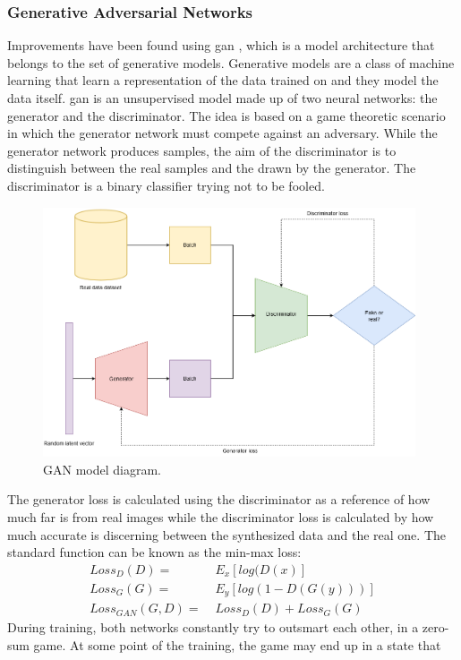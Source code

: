 \documentclass[../main.tex]{subfiles}
\begin{document}
\subsubsection{Generative Adversarial Networks}
Improvements have been found using \gls{gan} \cite{goodfellow2014generative}, which is a model architecture that belongs to the set of generative models. Generative models are a class of machine learning that learn a representation of the data trained on and they model the data itself. \gls{gan} is an unsupervised model made up of two neural networks: the generator and the discriminator. The idea is based on a game theoretic scenario in which the generator network must compete against an adversary. While the generator network produces samples, the aim of the discriminator is to distinguish between the real samples and the drawn by the generator. The discriminator is a binary classifier trying not to be fooled. 
\begin{figure}[H]
	\centering
	\includegraphics[width=11cm]{imgs/relatedwork/gan.png}
	\caption{GAN model diagram.}
	\label{fig:related-gan-diagram}
\end{figure}
The generator loss is calculated using the discriminator as a reference of how much far is from real images while the discriminator loss is calculated by how much accurate is discerning between the synthesized data and the real one. The standard function can be known as the min-max loss:
\begin{align}
	\label{eq:gan}
	Loss_D(D) =& \; E_x[log(D(x)]\\
	Loss_G(G) =& \; E_y[log(1 - D(G(y)))]\\
	Loss_{GAN}(G, D) =&\; Loss_D(D) + Loss_G(G)
\end{align}
During training, both networks constantly try to outsmart each
other, in a zero-sum game. At some point of the training, the game may end up in a state that
\end{document}
